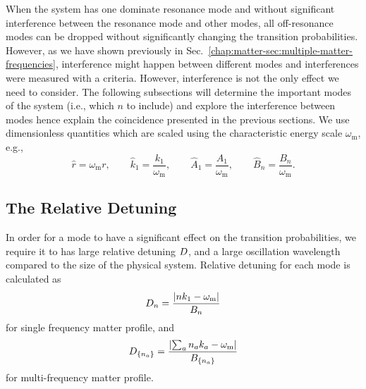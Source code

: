 When the system has one dominate resonance mode and without significant interference between the resonance mode and other modes, all off-resonance modes can be dropped without significantly changing the transition probabilities. However, as we have shown previously in Sec.~\ref{chap:matter-sec:multiple-matter-frequencies}, interference might happen between different modes and interferences were measured with a criteria. However, interference is not the only effect we need to consider. The following subsections will determine the important modes of the system (i.e., which $n$ to include) and explore the interference between modes hence explain the coincidence presented in the previous sections. We use dimensionless quantities which are scaled using the characteristic energy scale $\omega_{\mathrm{m}}$, e.g.,
\begin{equation}
    \hat r = \omega_{\mathrm{m}}r, \qquad
    \hat k_1  = \frac{k_1}{\omega_{\mathrm{m}}},  \qquad
    \hat A_1  = \frac{A_1}{\omega_{\mathrm{m}}},  \qquad
    \hat B_n = \frac{B_n}{\omega_{\mathrm{m}}}.
\end{equation}







\subsection{The Relative Detuning}


In order for a mode to have a significant effect on the transition probabilities, we require it to has large relative detuning $D$, and a large oscillation wavelength compared to the size of the physical system. Relative detuning for each mode is calculated as
\begin{equation}
D_n = \frac{\lvert n k_1 - \omega_{\mathrm{m}} \rvert}{B_n}
\end{equation}
for single frequency matter profile, and
\begin{equation}
D_{\{n_a\}} = \frac{\lvert \sum_a n_a k_a -\omega_{\mathrm m} \rvert }{B_{\{n_a\}}}
\end{equation}
for multi-frequency matter profile.



